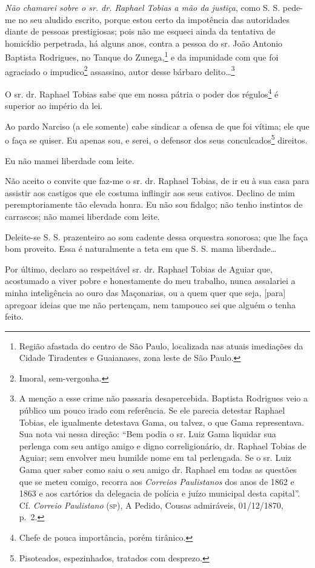 \emph{Não chamarei sobre o sr. dr. Raphael Tobias a mão da justiça},
como S. S. pede-me no seu aludido escrito, porque estou certo da
impotência das autoridades diante de pessoas prestigiosas; pois não me
esqueci ainda da tentativa de homicídio perpetrada, há alguns anos,
contra a pessoa do sr. João Antonio Baptista Rodrigues, no Tanque do
Zunega,\footnote{ Região afastada do centro de São Paulo, localizada
  nas atuais imediações da Cidade Tiradentes e Guaianases, zona leste de
  São Paulo.} e da impunidade com que foi agraciado o
impudico\footnote{ Imoral, sem-vergonha.} assassino, autor desse
bárbaro delito\ldots{}\footnote{ A menção a esse crime não passaria
  desapercebida. Baptista Rodrigues veio a público um pouco irado com
  referência. Se ele parecia detestar Raphael Tobias, ele igualmente
  detestava Gama, ou talvez, o que Gama representava. Sua nota vai nessa
  direção: ``Bem podia o sr. Luiz Gama liquidar sua perlenga com seu
  antigo amigo e digno correligionário, dr. Raphael Tobias de Aguiar;
  sem envolver meu humilde nome em tal perlengada. Se o sr. Luiz Gama
  quer saber como saiu o seu amigo dr. Raphael em todas as questões que
  se meteu comigo, recorra aos \emph{Correios Paulistanos} dos anos de
  1862 e 1863 e aos cartórios da delegacia de polícia e juízo municipal
  desta capital''. Cf. \emph{Correio Paulistano} (\textsc{sp}), A Pedido,
  Cousas admiráveis, 01/12/1870, p.~2.}

O sr. dr. Raphael Tobias sabe que em nossa pátria o poder dos
régulos\footnote{ Chefe de pouca importância, porém tirânico.} é
superior ao império da lei.

Ao pardo Narciso (a ele somente) cabe sindicar a ofensa de que foi
vítima; ele que o faça se quiser. Eu apenas sou, e serei, o defensor dos
seus conculcados\footnote{ Pisoteados, espezinhados, tratados com
  desprezo.} direitos.

Eu não mamei liberdade com leite.

Não aceito o convite que faz-me o sr. dr. Raphael Tobias, de ir eu à sua
casa para assistir aos castigos que ele costuma inflingir aos seus
cativos. Declino de mim peremptoriamente tão elevada honra. Eu não sou
fidalgo; não tenho instintos de carrascos; não mamei liberdade com
leite.

Deleite-se S. S. prazenteiro ao som cadente dessa orquestra sonorosa;
que lhe faça bom proveito. Essa é naturalmente a teta em que S. S. mama
liberdade\ldots{}

Por último, declaro ao respeitável sr. dr. Raphael Tobias de Aguiar que,
acostumado a viver pobre e honestamente do meu trabalho, nunca
assalariei a minha inteligência ao ouro das Maçonarias, ou a quem quer
que seja, {[}para{]} apregoar ideias que me não pertençam, nem tampouco
sei que alguém o tenha feito.

